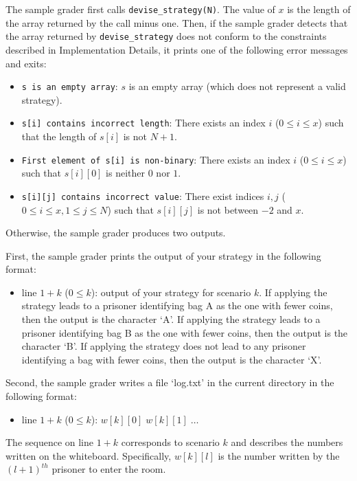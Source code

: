 The sample grader first calls \texttt{devise\_strategy(N)}.
The value of $x$ is the length of the array returned by the call minus one.
Then, if the sample grader detects that the array returned by \texttt{devise\_strategy} does not conform to the constraints described in Implementation Details, it prints one of the following error messages and exits:


\begin{itemize}
\item \texttt{s is an empty array}: $s$ is an empty array (which does not represent a valid strategy).
\item \texttt{s[i] contains incorrect length}: There exists an index $i$ ($0 \le i \le x$) such that the length of $s[i]$ is not $N + 1$.
\item \texttt{First element of s[i] is non-binary}: There exists an index $i$ ($0 \le i \le x$) such that $s[i][0]$ is neither $0$ nor $1$.
\item \texttt{s[i][j] contains incorrect value}: There exist indices $i, j$ ($0 \le i \le x, 1 \le j \le N$) such that $s[i][j]$ is not between $-2$ and $x$.
\end{itemize}

Otherwise, the sample grader produces two outputs.

First, the sample grader prints the output of your strategy in the following format:

\begin{itemize}
\item line $1 + k$ ($0 \le k$): output of your strategy for scenario $k$.
If applying the strategy leads to a prisoner identifying bag A as the one with fewer coins, then the output is the character `A'.
If applying the strategy leads to a prisoner identifying bag B as the one with fewer coins, then the output is the character `B'.
If applying the strategy does not lead to any prisoner identifying a bag with fewer coins, then the output is the character `X'.
\end{itemize}


Second, the sample grader writes a file `log.txt' in the current directory in the following format:
\begin{itemize}
\item line $1 + k$ ($0 \le k$): $w[k][0] \; w[k][1] \; \ldots$
\end{itemize}

The sequence on line $1 + k$ corresponds to scenario $k$ and describes the numbers written on the whiteboard.
Specifically, $w[k][l]$ is the number written by the ${(l+1)}^{th}$ prisoner to enter the room.
